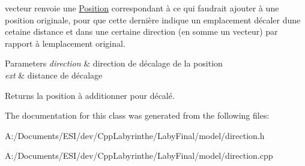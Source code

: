 vecteur renvoie une \mbox{\hyperlink{class_position}{Position}} correspondant à ce qui faudrait ajouter à une position originale, pour que cette dernière indique un emplacement décaler d\textquotesingle{}une cetaine distance et dans une certaine direction (en somme un vecteur) par rapport à l\textquotesingle{}emplacement original. 


\begin{DoxyParams}{Parameters}
{\em direction} & direction de décalage de la position \\
\hline
{\em ext} & distance de décalage \\
\hline
\end{DoxyParams}
\begin{DoxyReturn}{Returns}
la position à additionner pour décalé. 
\end{DoxyReturn}


The documentation for this class was generated from the following files\+:\begin{DoxyCompactItemize}
\item 
A\+:/\+Documents/\+E\+S\+I/dev/\+Cpp\+Labyrinthe/\+Laby\+Final/model/direction.\+h\item 
A\+:/\+Documents/\+E\+S\+I/dev/\+Cpp\+Labyrinthe/\+Laby\+Final/model/direction.\+cpp\end{DoxyCompactItemize}
